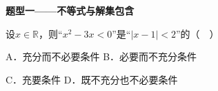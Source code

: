 \documentclass[12pt,a4paper]{article}
\newcommand{\qtitle}[1]{{\Large\bfseries\color[HTML]{1F3864}#1}\par\vspace{0.9em}}
\begin{document}
\qtitle{题型一——不等式与解集包含}

设$x\in\mathbb{R}$，则“$x^2-3x<0$”是“$|x-1|<2$”的（　）\par
\vspace{0.9em}
A．充分而不必要条件 \qquad\qquad B．必要而不充分条件\par
\vspace{0.45em}
C．充要条件 \qquad\qquad D．既不充分也不必要条件\par
\vspace{0.45em}
\end{document}
